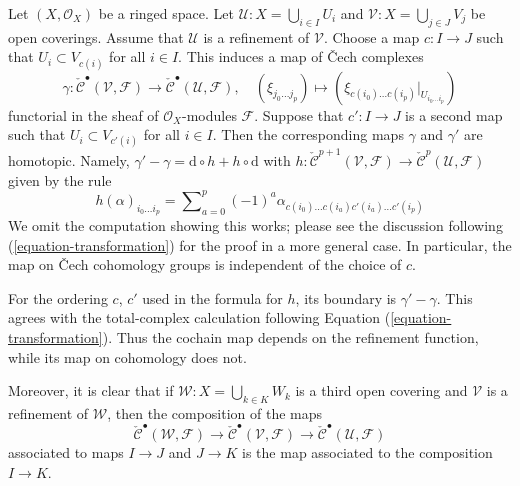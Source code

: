 \noindent
Let $(X, \mathcal{O}_X)$ be a ringed space. Let
$\mathcal{U} : X = \bigcup_{i \in I} U_i$ and
$\mathcal{V} : X = \bigcup_{j \in J} V_j$ be open coverings.
Assume that $\mathcal{U}$ is a refinement of $\mathcal{V}$.
Choose a map $c : I \to J$ such that $U_i \subset V_{c(i)}$
for all $i \in I$. This induces a map of {\v C}ech complexes
$$
\gamma :
\check{\mathcal{C}}^\bullet(\mathcal{V}, \mathcal{F})
\longrightarrow
\check{\mathcal{C}}^\bullet(\mathcal{U}, \mathcal{F}),
\quad
(\xi_{j_0 \ldots j_p})
\longmapsto
(\xi_{c(i_0) \ldots c(i_p)}|_{U_{i_0 \ldots i_p}})
$$
functorial in the sheaf of $\mathcal{O}_X$-modules $\mathcal{F}$.
Suppose that $c' : I \to J$ is a second map such that
$U_i \subset V_{c'(i)}$ for all $i \in I$. Then the corresponding maps
$\gamma$ and $\gamma'$ are homotopic. Namely,
$\gamma' - \gamma = \text{d} \circ h + h \circ \text{d}$
with
$h : \check{\mathcal{C}}^{p + 1}(\mathcal{V}, \mathcal{F}) \to
\check{\mathcal{C}}^p(\mathcal{U}, \mathcal{F})$
given by the rule
$$
h(\alpha)_{i_0 \ldots i_p} =
\sum\nolimits_{a = 0}^{p}
(-1)^a
\alpha_{c(i_0)\ldots c(i_a) c'(i_a) \ldots c'(i_p)}
$$
We omit the computation showing this works; please see the discussion
following (\ref{equation-transformation}) for the proof in a more general
case. In particular, the map on {\v C}ech cohomology groups is independent
of the choice of $c$.

\begin{remark}
\label{remark-FAC-refinement-homotopy}
\begin{reference}
\cite[Chapter I, \S 3, no. 21, Proposition 3, pp. 214--215]{FAC}
\end{reference}
For the ordering $c$, $c'$ used in the formula for $h$, its boundary is
$\gamma' - \gamma$. This agrees with the total-complex calculation
following Equation (\ref{equation-transformation}). Thus the cochain map
depends on the refinement function, while its map on cohomology does not.
\end{remark}

\noindent
Moreover, it is clear that if
$\mathcal{W} : X = \bigcup_{k \in K} W_k$ is a third open covering
and $\mathcal{V}$ is a refinement of $\mathcal{W}$, then the composition
of the maps
$$
\check{\mathcal{C}}^\bullet(\mathcal{W}, \mathcal{F})
\longrightarrow
\check{\mathcal{C}}^\bullet(\mathcal{V}, \mathcal{F})
\longrightarrow
\check{\mathcal{C}}^\bullet(\mathcal{U}, \mathcal{F})
$$
associated to maps $I \to J$ and $J \to K$ is the map associated
to the composition $I \to K$.

